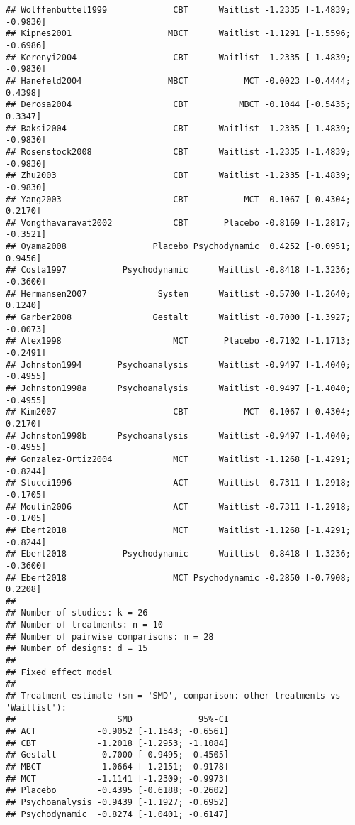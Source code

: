 \documentclass[]{book}
\theoremstyle{definition}
\theoremstyle{definition}
\theoremstyle{definition}
\theoremstyle{remark}
\begin{document}
\begin{verbatim}
## Wolffenbuttel1999             CBT      Waitlist -1.2335 [-1.4839; -0.9830]
## Kipnes2001                   MBCT      Waitlist -1.1291 [-1.5596; -0.6986]
## Kerenyi2004                   CBT      Waitlist -1.2335 [-1.4839; -0.9830]
## Hanefeld2004                 MBCT           MCT -0.0023 [-0.4444;  0.4398]
## Derosa2004                    CBT          MBCT -0.1044 [-0.5435;  0.3347]
## Baksi2004                     CBT      Waitlist -1.2335 [-1.4839; -0.9830]
## Rosenstock2008                CBT      Waitlist -1.2335 [-1.4839; -0.9830]
## Zhu2003                       CBT      Waitlist -1.2335 [-1.4839; -0.9830]
## Yang2003                      CBT           MCT -0.1067 [-0.4304;  0.2170]
## Vongthavaravat2002            CBT       Placebo -0.8169 [-1.2817; -0.3521]
## Oyama2008                 Placebo Psychodynamic  0.4252 [-0.0951;  0.9456]
## Costa1997           Psychodynamic      Waitlist -0.8418 [-1.3236; -0.3600]
## Hermansen2007              System      Waitlist -0.5700 [-1.2640;  0.1240]
## Garber2008                Gestalt      Waitlist -0.7000 [-1.3927; -0.0073]
## Alex1998                      MCT       Placebo -0.7102 [-1.1713; -0.2491]
## Johnston1994       Psychoanalysis      Waitlist -0.9497 [-1.4040; -0.4955]
## Johnston1998a      Psychoanalysis      Waitlist -0.9497 [-1.4040; -0.4955]
## Kim2007                       CBT           MCT -0.1067 [-0.4304;  0.2170]
## Johnston1998b      Psychoanalysis      Waitlist -0.9497 [-1.4040; -0.4955]
## Gonzalez-Ortiz2004            MCT      Waitlist -1.1268 [-1.4291; -0.8244]
## Stucci1996                    ACT      Waitlist -0.7311 [-1.2918; -0.1705]
## Moulin2006                    ACT      Waitlist -0.7311 [-1.2918; -0.1705]
## Ebert2018                     MCT      Waitlist -1.1268 [-1.4291; -0.8244]
## Ebert2018           Psychodynamic      Waitlist -0.8418 [-1.3236; -0.3600]
## Ebert2018                     MCT Psychodynamic -0.2850 [-0.7908;  0.2208]
## 
## Number of studies: k = 26
## Number of treatments: n = 10
## Number of pairwise comparisons: m = 28
## Number of designs: d = 15
## 
## Fixed effect model
## 
## Treatment estimate (sm = 'SMD', comparison: other treatments vs 'Waitlist'):
##                    SMD             95%-CI
## ACT            -0.9052 [-1.1543; -0.6561]
## CBT            -1.2018 [-1.2953; -1.1084]
## Gestalt        -0.7000 [-0.9495; -0.4505]
## MBCT           -1.0664 [-1.2151; -0.9178]
## MCT            -1.1141 [-1.2309; -0.9973]
## Placebo        -0.4395 [-0.6188; -0.2602]
## Psychoanalysis -0.9439 [-1.1927; -0.6952]
## Psychodynamic  -0.8274 [-1.0401; -0.6147]

\end{verbatim}
\end{document}
